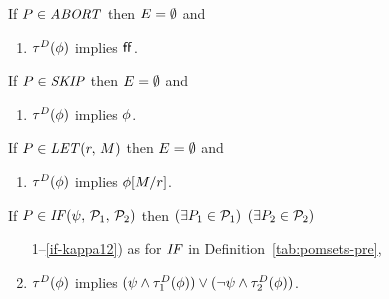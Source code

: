 
\begin{definition}
  If $\aPS\SB0\in\sABORT$ then $\aEvs\SB0 = \emptyset$ and
  \begin{enumerate}
  \item $\aTr[\bEvs]\SB0(\aForm)$ implies $\FALSE$.
  \end{enumerate}

  \noindent
  If $\aPS\SB0\in\sSKIP$ then $\aEvs\SB0 = \emptyset$ and
  \begin{enumerate}
  \item $\aTr[\bEvs]\SB0(\aForm)$ implies $\aForm$.
  \end{enumerate}

  \noindent
  If $\aPS\SB0\in\sLET{\aReg}{\aExp}$ then $\aEvs\SB0 = \emptyset$ and
  \begin{enumerate}
  \item $\aTr[\bEvs]\SB0(\aForm)$ implies $\aForm[\aExp/\aReg]$.
  \end{enumerate}

  \noindent
  If $\aPS\SB0 \in \sIF{\bForm}\sTHEN\aPSS_1\sELSE\aPSS_2\sFI$ then
  $(\exists\aPS_1\in\aPSS_1)$ $(\exists\aPS_2\in\aPSS_2)$
  \begin{enumerate}
    \setcounter{enumi}{\value{pomsetPreIfCount}}
  \item[1--\ref{if-kappa12})] as for $\sIF{}$ in Definition~\ref{tab:pomsets-pre},
  \item \label{if-tau}
    $\aTr[\bEvs]\SB0(\aForm)$ implies $(\bForm\land\aTr[\bEvs]_1(\aForm))\lor(\neg\bForm\land\aTr[\bEvs]_2(\aForm))$.
  \end{enumerate}


\end{definition}
